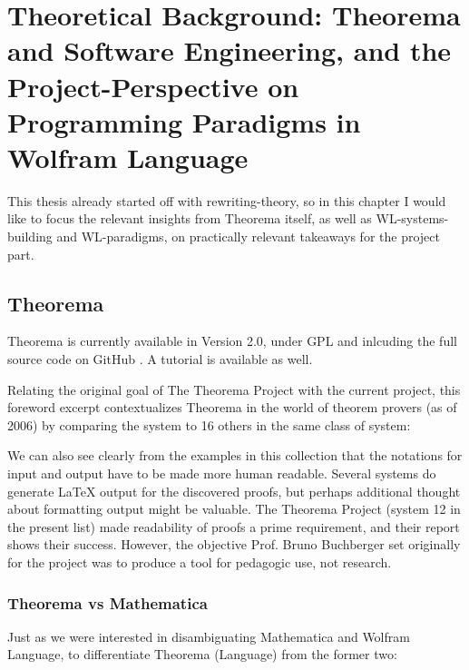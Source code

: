 \chapter{Theoretical Background: Theorema and Software Engineering, and the Project-Perspective on Programming Paradigms in Wolfram Language}
\label{cha:Theory}

This thesis already started off with rewriting-theory, so in this chapter I would like to focus the relevant insights from Theorema itself, as well as WL-systems-building and WL-paradigms, on practically relevant takeaways for the project part.

\section{Theorema} \label{tma}

Theorema is currently available in Version 2.0, under GPL \cite{noauthor_httpswww3riscjkuatresearchtheoremasoftware_nodate} and inlcuding the full source code on GitHub \cite{noauthor_github_nodate}. A tutorial is available as well. \cite{windsteiger_theorema_2017}

Relating the original goal of The Theorema Project with the current project, this foreword excerpt contextualizes Theorema in the world of theorem provers (as of 2006) by comparing the system to 16 others in the same class of system:

\begin{displayquote}
We can also see clearly from the examples in this collection that the notations
for input and output have to be made more human readable. Several systems do
generate LaTeX output for the discovered proofs, but perhaps additional thought
about formatting output might be valuable. The Theorema Project (system 12
in the present list) made readability of proofs a prime requirement, and their
report shows their success. However, the objective Prof. Bruno Buchberger set
originally for the project was to produce a tool for pedagogic use, not research.
\cite[p. 4]{g_mayrhofer_s_saminger__w_winsteiger_theorema_nodate}
\end{displayquote}

\subsection{Theorema vs Mathematica}

Just as we were interested in disambiguating Mathematica and Wolfram Language, to differentiate Theorema (Language) from the former two:

